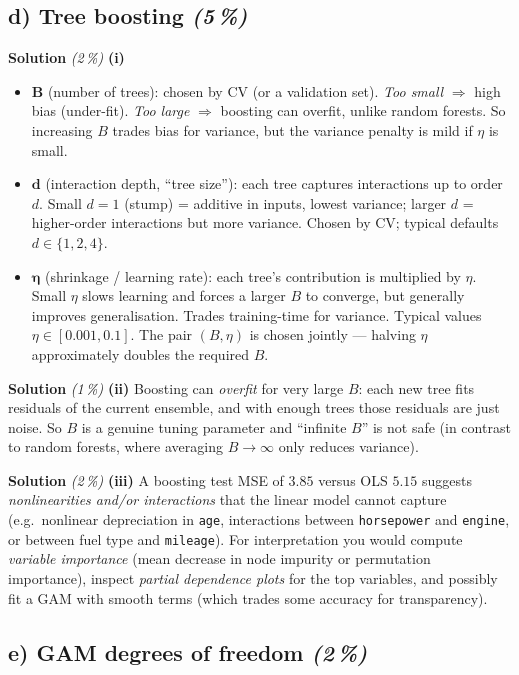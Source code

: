 \documentclass[11pt,a4paper]{article}
\newcommand{\subpoints}[1]{\textit{(#1\,\%)}}
\newcommand{\sol}{\noindent\textbf{Solution}}
\begin{document}
\subsection*{d) Tree boosting \subpoints{5}}

\sol{} \subpoints{2} \textbf{(i)}
\begin{itemize}
  \item $\bm B$ (number of trees): chosen by CV (or a validation set). \emph{Too small} $\Rightarrow$
        high bias (under-fit). \emph{Too large} $\Rightarrow$ boosting can overfit, unlike random
        forests. So increasing $B$ trades bias for variance, but the variance penalty is mild if
        $\eta$ is small.
  \item $\bm d$ (interaction depth, ``tree size''): each tree captures interactions up to order $d$.
        Small $d=1$ (stump) = additive in inputs, lowest variance; larger $d$ = higher-order
        interactions but more variance. Chosen by CV; typical defaults $d\in\{1,2,4\}$.
  \item $\bm\eta$ (shrinkage / learning rate): each tree's contribution is multiplied by $\eta$.
        Small $\eta$ slows learning and forces a larger $B$ to converge, but generally improves
        generalisation. Trades training-time for variance. Typical values $\eta\in[0.001, 0.1]$.
        The pair $(B,\eta)$ is chosen jointly --- halving $\eta$ approximately doubles the required $B$.
\end{itemize}

\medskip
\sol{} \subpoints{1} \textbf{(ii)} Boosting can \emph{overfit} for very large $B$: each new tree
fits residuals of the current ensemble, and with enough trees those residuals are just noise. So
$B$ is a genuine tuning parameter and ``infinite $B$'' is not safe (in contrast to random forests,
where averaging $B\to\infty$ only reduces variance).

\medskip
\sol{} \subpoints{2} \textbf{(iii)} A boosting test MSE of $3.85$ versus OLS $5.15$ suggests
\emph{nonlinearities and/or interactions} that the linear model cannot capture (e.g.\ nonlinear
depreciation in \texttt{age}, interactions between \texttt{horsepower} and \texttt{engine}, or
between fuel type and \texttt{mileage}). For interpretation you would compute \emph{variable
importance} (mean decrease in node impurity or permutation importance), inspect \emph{partial
dependence plots} for the top variables, and possibly fit a GAM with smooth terms (which trades
some accuracy for transparency).

\subsection*{e) GAM degrees of freedom \subpoints{2}}
\end{document}
